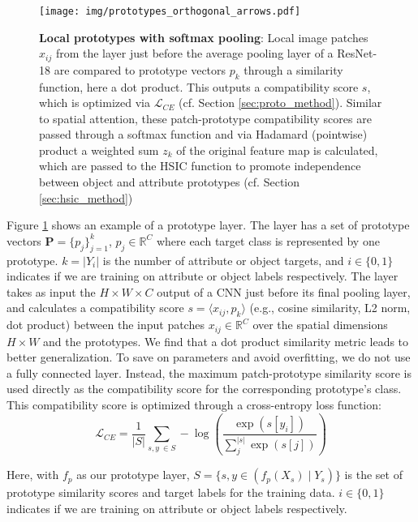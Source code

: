 \documentclass{article}
\begin{document}
\begin{figure}
    \centering
    \texttt{[image: img/prototypes\_orthogonal\_arrows.pdf]}
    \caption{\textbf{Local prototypes with softmax pooling}: Local image patches $x_{ij}$ from the layer just before the average pooling layer of a ResNet-18 are compared to prototype vectors $p_k$ through a similarity function, here a dot product. This outputs a compatibility score $s$, which is optimized via $\mathcal{L}_{CE}$ (cf. Section \ref{sec:proto_method}). Similar to spatial attention, these patch-prototype compatibility scores are passed through a softmax function and via Hadamard (pointwise) product a weighted sum $z_k$ of the original feature map is calculated, which are passed to the HSIC function to promote independence between object and attribute prototypes (cf. Section \ref{sec:hsic_method})}
    \label{fig:prototypes}
\end{figure}

Figure \ref{fig:prototypes} shows an example of a prototype layer. The layer has a set of prototype vectors $\mathbf{P} = \{p_j\}_{j=1}^k$, $p_j \in \mathbb{R}^C$ where each target class is represented by one prototype. $k = |Y_i|$ is the number of attribute or object targets, and $i \in \{0, 1\}$ indicates if we are training on attribute or object labels respectively. The layer takes as input the $H \times W \times C$ output of a CNN just before its final pooling layer, and calculates a compatibility score $s = \langle x_{ij}, p_k \rangle $ (e.g., cosine similarity, L2 norm, dot product) between the input patches $x_{ij} \in \mathbb{R}^C$ over the spatial dimensions $H \times W$ and the prototypes. We find that a dot product similarity metric leads to better generalization. To save on parameters and avoid overfitting, we do not use a fully connected layer. Instead, the maximum patch-prototype similarity score is used directly as the compatibility score for the corresponding prototype's class. This compatibility score is optimized through a cross-entropy loss function:
%
\begin{equation}
\mathcal{L}_{CE} = \frac{1}{|S|} \sum_{s, y~\in S} - \log\left(\frac{\exp(s[y_i])}{\sum_j^{|s|} \exp(s[j])}\right)
\end{equation}

Here, with $f_p$ as our prototype layer, $S = \{ s, y \in \left(f_p(X_s) \mid Y_s \right)\}$ is the set of prototype similarity scores and target labels for the training data. $i \in \{0, 1\}$ indicates if we are training on attribute or object labels respectively.
\end{document}
